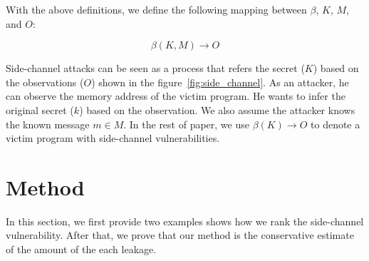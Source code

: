 With the above definitions, we define the following mapping between $\beta$,
$K$, $M$, and $O$:

\begin{displaymath}
    \beta(K, M) \rightarrow O
\end{displaymath}


Side-channel attacks can be seen as a process that refers the secret ($K$) based on the observations ($O$) shown in the figure~\ref{fig:side_channel}. As an attacker, he can observe the memory address of the victim program. He wants to infer the original secret ($k$) based on the observation. We also assume the attacker knows the known message $m \in M$. In the rest of paper, we use $\beta(K) \rightarrow O$ to denote a victim program with side-channel vulnerabilities.

\section{Method}
In this section, we first provide two examples shows how we rank the side-channel vulnerability. After that, we prove that our method is the conservative estimate of the amount of the each leakage.

